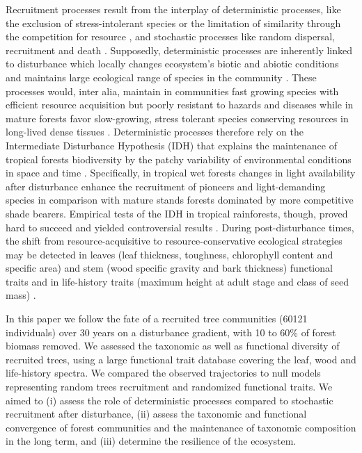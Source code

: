 \documentclass[fleqn,10pt]{ArtEcoFoG} %
\begin{document}
Recruitment processes result from the interplay of deterministic
processes, like the exclusion of stress-intolerant species or the
limitation of similarity through the competition for resource
\citep{Ackerly2003, McGill2006}, and stochastic processes like random
dispersal, recruitment and death \citep{Hubbell2001}. Supposedly,
deterministic processes are inherently linked to disturbance which
locally changes ecosystem's biotic and abiotic conditions and maintains
large ecological range of species in the community
\citep{Molino2001, Bongers2009}. These processes would, inter alia,
maintain in communities fast growing species with efficient resource
acquisition but poorly resistant to hazards and diseases while in mature
forests favor slow-growing, stress tolerant species conserving resources
in long-lived dense tissues \citep{Denslow1980}. Deterministic processes
therefore rely on the Intermediate Disturbance Hypothesis (IDH) that
explains the maintenance of tropical forests biodiversity by the patchy
variability of environmental conditions in space and time
\citep{Guitet2018}. Specifically, in tropical wet forests changes in
light availability after disturbance enhance the recruitment of pioneers
and light-demanding species in comparison with mature stands forests
dominated by more competitive shade bearers. Empirical tests of the IDH
in tropical rainforests, though, proved hard to succeed and yielded
controversial results \citep{Hubbell1999, Molino2001, Sheil2003}. During
post-disturbance times, the shift from resource-acquisitive to
resource-conservative ecological strategies may be detected in leaves
(leaf thickness, toughness, chlorophyll content and specific area) and
stem (wood specific gravity and bark thickness) functional traits and in
life-history traits (maximum height at adult stage and class of seed
mass) \citep{Wright2004, Chave2009b, Herault2011}.

In this paper we follow the fate of a recruited tree communities (60121
individuals) over 30 years on a disturbance gradient, with 10 to 60\% of
forest biomass removed. We assessed the taxonomic as well as functional
diversity of recruited trees, using a large functional trait database
covering the leaf, wood and life-history spectra. We compared the
observed trajectories to null models representing random trees
recruitment and randomized functional traits. We aimed to (i) assess the
role of deterministic processes compared to stochastic recruitment after
disturbance, (ii) assess the taxonomic and functional convergence of
forest communities and the maintenance of taxonomic composition in the
long term, and (iii) determine the resilience of the ecosystem.
\end{document}
